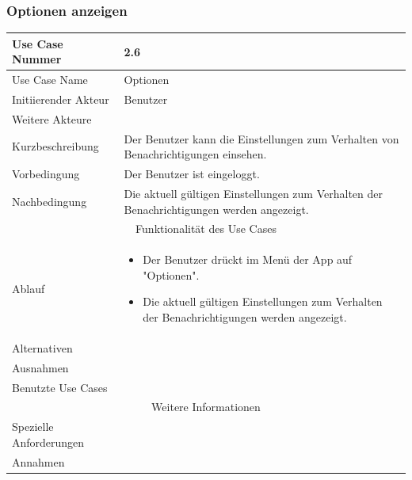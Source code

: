 \documentclass[10pt,a4paper]{article}
\begin{document}
\subsubsection{Optionen anzeigen}
	\begin{tabularx}{\textwidth}{|l|X|}
	\hline Use Case Nummer & 2.6 \\ 
	\hline Use Case Name & Optionen \\ 
	\hline Initiierender Akteur & Benutzer \\
	\hline Weitere Akteure &  \\
	\hline Kurzbeschreibung & Der Benutzer kann die Einstellungen zum Verhalten von Benachrichtigungen einsehen. \\
	\hline Vorbedingung & Der Benutzer ist eingeloggt. \\
	\hline Nachbedingung & Die aktuell gültigen Einstellungen zum Verhalten der Benachrichtigungen werden angezeigt. \\
	\hline \multicolumn{2}{|c|}{Funktionalität des Use Cases}\\
	\hline Ablauf & \begin{itemize}
		\item Der Benutzer drückt im Menü der App auf "Optionen".
		\item Die aktuell gültigen Einstellungen zum Verhalten der Benachrichtigungen werden angezeigt.
	\end{itemize} \\
	\hline Alternativen &  \\
	\hline Ausnahmen &  \\
	\hline Benutzte Use Cases &  \\
	\hline \multicolumn{2}{|c|}{Weitere Informationen} \\
	\hline Spezielle Anforderungen &  \\
	\hline Annahmen &  \\
	\hline
	\end{tabularx}
\end{document}
